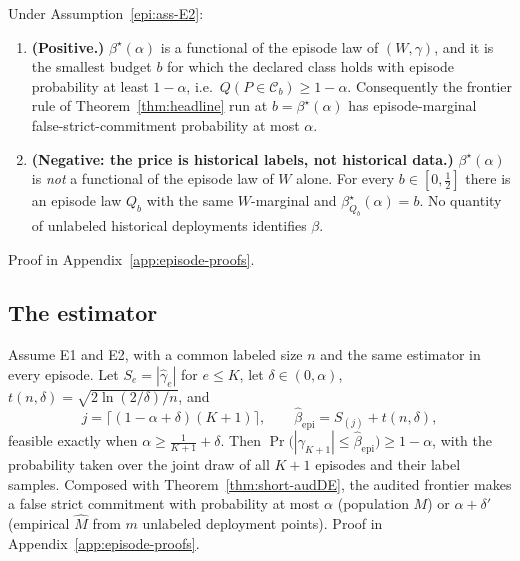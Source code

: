 \begin{theorem}\label{epi:thm-ident}
Under Assumption~\ref{epi:ass-E2}:
\begin{enumerate}
\item[\textnormal{(a)}] \textbf{(Positive.)} $\beta^\star(\alpha)$ is a functional of the episode law
of $(W,\gamma)$, and it is the smallest budget $b$ for which the declared class holds with episode
probability at least $1-\alpha$, i.e.\ $Q(P\in\mathcal C_b)\ge1-\alpha$. Consequently the frontier
rule of Theorem~\ref{thm:headline} run at $b=\beta^\star(\alpha)$ has episode-marginal
false-strict-commitment probability at most $\alpha$.
\item[\textnormal{(b)}] \textbf{(Negative: the price is historical labels, not historical data.)}
$\beta^\star(\alpha)$ is \emph{not} a functional of the episode law of $W$ alone. For every
$b\in[0,\tfrac12]$ there is an episode law $Q_b$ with the same $W$-marginal and
$\beta^\star_{Q_b}(\alpha)=b$. No quantity of unlabeled historical deployments identifies $\beta$.
\end{enumerate}
Proof in Appendix~\ref{app:episode-proofs}.
\end{theorem}

\subsection{The estimator}

\begin{theorem}\label{epi:thm-conformal}
Assume E1 and E2, with a common labeled size $n$ and the same estimator in every episode. Let
$S_e=|\widehat\gamma_e|$ for $e\le K$, let $\delta\in(0,\alpha)$,
$t(n,\delta)=\sqrt{2\ln(2/\delta)/n}$, and
\[
j=\bigl\lceil(1-\alpha+\delta)(K+1)\bigr\rceil,
\qquad
\widehat\beta_{\mathrm{epi}}=S_{(j)}+t(n,\delta),
\]
feasible exactly when $\alpha\ge\tfrac1{K+1}+\delta$. Then
$\Pr\bigl(|\gamma_{K+1}|\le\widehat\beta_{\mathrm{epi}}\bigr)\ge1-\alpha$, with the probability
taken over the joint draw of all $K+1$ episodes and their label samples. Composed with
Theorem~\ref{thm:short-audDE}, the audited frontier makes a false strict commitment with
probability at most $\alpha$ (population $M$) or $\alpha+\delta'$ (empirical $\widehat M$ from $m$
unlabeled deployment points). Proof in Appendix~\ref{app:episode-proofs}.
\end{theorem}

